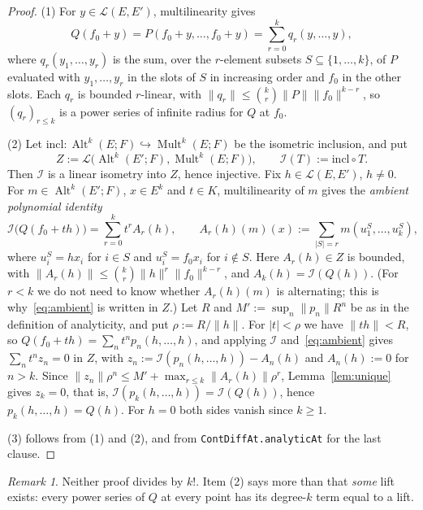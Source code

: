 \documentclass[11pt]{amsart}
\theoremstyle{definition}
\theoremstyle{remark}
\newtheorem{remark}[theorem]{Remark}
\numberwithin{equation}{section}
\newcommand{\cL}{\mathcal{L}}
\newcommand{\Alt}{\operatorname{Alt}}
\newcommand{\Mult}{\operatorname{Mult}}
\newcommand{\incl}{\mathrm{incl}}
\newcommand{\abs}[1]{\lvert #1\rvert}
\newcommand{\norm}[1]{\lVert #1\rVert}
\begin{document}
\begin{proof}
(1) For $y\in\cL(E,E')$, multilinearity gives
\[
Q(f_0+y)=P(f_0+y,\dots,f_0+y)=\sum_{r=0}^kq_r(y,\dots,y),
\]
where $q_r(y_1,\dots,y_r)$ is the sum, over the $r$\nobreakdash-element subsets $S\subseteq\{1,\dots,k\}$, of $P$ evaluated with
$y_1,\dots,y_r$ in the slots of $S$ in increasing order and $f_0$ in the other slots. Each $q_r$ is
bounded $r$\nobreakdash-linear, with $\norm{q_r}\le\binom kr\norm P\norm{f_0}^{k-r}$, so $(q_r)_{r\le k}$ is a power series of
infinite radius for $Q$ at $f_0$.

(2) Let $\incl\colon\Alt^k(E;F)\hookrightarrow\Mult^k(E;F)$ be the isometric inclusion, and put
\[
Z:=\cL\bigl(\Alt^k(E';F),\Mult^k(E;F)\bigr),\qquad \mathcal I(T):=\incl\circ T .
\]
Then $\mathcal I$ is a linear isometry into $Z$, hence injective.
Fix $h\in\cL(E,E')$, $h\neq0$. For $m\in\Alt^k(E';F)$, $x\in E^k$ and $t\in K$, multilinearity of $m$ gives the
\emph{ambient polynomial identity}
\begin{equation}\label{eq:ambient}
\mathcal I\bigl(Q(f_0+th)\bigr)=\sum_{r=0}^kt^rA_r(h),\qquad A_r(h)(m)(x):=\sum_{\abs S=r}m(u^S_1,\dots,u^S_k),
\end{equation}
where $u^S_i=hx_i$ for $i\in S$ and $u^S_i=f_0x_i$ for $i\notin S$. Here $A_r(h)\in Z$ is bounded, with
$\norm{A_r(h)}\le\binom kr\norm h^r\norm{f_0}^{k-r}$, and $A_k(h)=\mathcal I(Q(h))$. (For $r<k$ we do not need to know whether
$A_r(h)(m)$ is alternating; this is why~\eqref{eq:ambient} is written in $Z$.) Let $R$ and $M':=\sup_n\norm{p_n}R^n$ be
as in the definition of analyticity, and put $\rho:=R/\norm h$. For $\abs t<\rho$ we have $\norm{th}<R$, so
$Q(f_0+th)=\sum_nt^np_n(h,\dots,h)$, and applying $\mathcal I$ and~\eqref{eq:ambient} gives $\sum_nt^nz_n=0$ in $Z$, with
$z_n:=\mathcal I(p_n(h,\dots,h))-A_n(h)$ and $A_n(h):=0$ for $n>k$. Since
$\norm{z_n}\rho^n\le M'+\max_{r\le k}\norm{A_r(h)}\rho^r$, Lemma~\ref{lem:unique} gives $z_k=0$, that is,
$\mathcal I(p_k(h,\dots,h))=\mathcal I(Q(h))$, hence $p_k(h,\dots,h)=Q(h)$. For $h=0$ both sides vanish since $k\ge1$.

(3) follows from (1) and (2), and from \texttt{ContDiffAt.analyticAt} for the last clause.
\end{proof}

\begin{remark}\label{rem:liftlean}
Neither proof divides by $k!$. Item (2) says more than that \emph{some} lift exists: every power series of $Q$ at
every point has its degree-$k$ term equal to a lift.
\end{remark}
\end{document}
